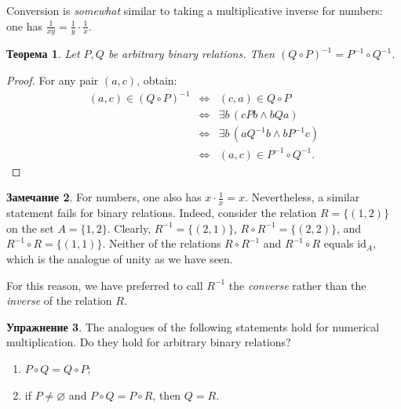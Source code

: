 \documentclass[12pt,notitlepage]{article}
\theoremstyle{plain}
\newtheorem{thm}{Теорема}[section]
\theoremstyle{definition}
\newtheorem{exc}[thm]{Упражнение}
\newtheorem{rem}[thm]{Замечание}
\theoremstyle{plain}
\newcommand{\void}{\varnothing}
\newcommand{\id}{\mathrm{id}}
\newcommand{\1}{\mathbf{1}}
\newcommand{\0}{\mathbf{0}}
\newcommand{\mcomm}[1]{}
\begin{document}
\noindent Conversion is \emph{somewhat} similar to taking a multiplicative inverse for numbers: one has $\frac{1}{xy} = \frac{1}{y} \cdot \frac{1}{x}$.

\mcomm{The Instructor might wish to compare conversion to matrix transposition or string reversion as well.}
\begin{thm}\label{ch0:comp_inv}
	Let $P, Q$ be arbitrary binary relations. Then $(Q \circ P)^{-1} = P^{-1} \circ Q^{-1}$.
\end{thm}
\begin{proof}
	For any pair $(a,c)$, obtain:
	$$
	\begin{array}{rcl}
		(a, c) \in (Q \circ P)^{-1} &\iff& (c, a) \in Q \circ P\\
		&\iff&\exists b\, (cPb \wedge bQa)\\
		&\iff&\exists b\, (a Q^{-1} b \wedge b P^{-1} c)\\
		&\iff&(a, c) \in P^{-1} \circ Q^{-1}.
	\end{array}
	$$
\end{proof}
\begin{rem}
	For numbers, one also has $x \cdot \frac{1}{x} = x$. Nevertheless, a similar statement fails for binary relations. Indeed, consider the relation $R = \{ (1, 2) \}$ on the set $A = \{1, 2\}$. Clearly, $R^{-1} = \{ (2,1) \}$, $R \circ R^{-1} = \{ (2,2)\}$, and $R^{-1} \circ R = \{ (1, 1)\}$. Neither of the relations $R \circ R^{-1}$ and $R^{-1} \circ R$ equals $\id_A$, which is the analogue of unity as we have seen.
	
	For this reason, we have preferred to call $R^{-1}$ the \emph{converse} rather than the \emph{inverse} of the relation $R$.
\end{rem}
\begin{exc}
	The analogues of the following statements hold for numerical multiplication. Do they hold for arbitrary binary relations?
	\begin{enumerate}
		\item $P \circ Q = Q \circ P$;
		\item if $P \neq \void$ and $P \circ Q = P \circ R$, then $Q = R$.
	\end{enumerate}
\end{exc}
\end{document}
